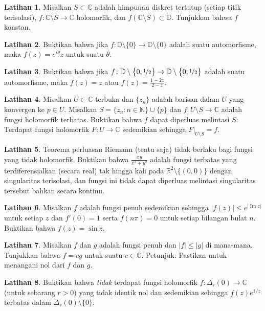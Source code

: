 \documentclass[12pt,openany]{book}
\renewcommand{\Im}{\operatorname{Im}}
\newcommand{\sabs}[1]{\lvert {#1} \rvert}
\newcommand{\C}{{\mathbb{C}}}
\newcommand{\R}{{\mathbb{R}}}
\newcommand{\N}{{\mathbb{N}}}
\newcommand{\D}{{\mathbb{D}}}
\theoremstyle{plain}
\theoremstyle{remark}
\theoremstyle{definition}
\newenvironment{exbox}{%
    \def\FrameCommand{\vrule width 1pt \relax\hspace{10pt}}%
    \MakeFramed{\advance\hsize-\width\FrameRestore}%
}{%
    \endMakeFramed
}
\theoremstyle{exercise}
\newtheorem{exercise}{Latihan}[section]
\theoremstyle{example}
\begin{document}
\begin{exbox}
\begin{exercise}
Misalkan $S \subset \C$ adalah himpunan diskret tertutup (setiap titik terisolasi),
$f \colon \C \setminus S \to \C$ holomorfik,
dan $f(\C \setminus S) \subset \D$.
Tunjukkan bahwa $f$ konstan.
\end{exercise}

\begin{exercise}
Buktikan bahwa jika $f \colon \D \setminus \{ 0 \} \to \D \setminus \{ 0 \}$
adalah suatu automorfisme, maka $f(z) = e^{i\theta} z$ untuk suatu $\theta$.
\end{exercise}

\begin{exercise}
Buktikan bahwa jika
$f \colon \D \setminus \bigl\{ 0, \nicefrac{1}{2} \bigr\} \to \D \setminus
\bigl\{ 0 , \nicefrac{1}{2} \bigr\}$
adalah suatu automorfisme, maka $f(z) = z$ atau $f(z) = \frac{1-2z}{2-z}$.
\end{exercise}

\begin{exercise}
Misalkan $U \subset \C$ terbuka dan
$\{ z_n \}$ adalah barisan dalam $U$ yang konvergen ke $p \in U$.
Misalkan $S = \{ z_n : n \in \N \} \cup \{ p \}$ dan
$f \colon U \setminus S \to \C$ adalah fungsi holomorfik terbatas.
Buktikan bahwa $f$ dapat diperluas melintasi $S$: Terdapat fungsi holomorfik
$F \colon U \to \C$ sedemikian sehingga $F|_{U \setminus S} = f$.
\end{exercise}

\begin{exercise}
Teorema perluasan Riemann (tentu saja) tidak berlaku bagi fungsi yang
tidak holomorfik. Buktikan bahwa $\frac{xy}{x^2+y^2}$ adalah fungsi terbatas yang
terdiferensialkan (secara real) tak hingga kali
pada $\R^2 \setminus \{ (0,0) \}$ dengan singularitas terisolasi, dan fungsi ini
tidak dapat
diperluas melintasi singularitas tersebut bahkan secara kontinu.
\end{exercise}

\begin{exercise}
Misalkan $f$ adalah fungsi penuh sedemikian sehingga
$\sabs{f(z)} \leq e^{\sabs{\Im z}}$ untuk setiap $z$ dan
$f'(0) =1$ serta $f(n\pi) = 0$ untuk setiap bilangan bulat $n$.
Buktikan bahwa $f(z) = \sin z$.
\end{exercise}

\begin{exercise}
Misalkan $f$ dan $g$ adalah fungsi penuh dan $\sabs{f} \leq \sabs{g}$
di mana-mana. Tunjukkan bahwa $f = c g$ untuk suatu $c \in \C$.
Petunjuk: Pastikan untuk menangani nol dari $f$ dan $g$.
\end{exercise}

\begin{exercise}
Buktikan bahwa \emph{tidak} terdapat fungsi holomorfik
$f \colon \Delta_r(0) \to \C$ (untuk sebarang $r > 0$)
yang tidak identik nol dan
sedemikian sehingga
$f(z) e^{1/z}$ terbatas dalam $\Delta_r(0) \setminus \{ 0 \}$.
\end{exercise}
\end{exbox}
\end{document}
